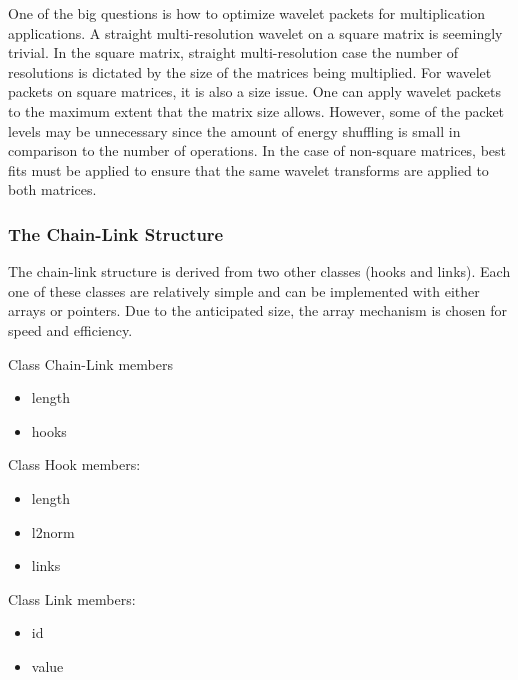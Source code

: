 One of the big questions is how to optimize wavelet packets for multiplication applications.  A straight multi-resolution wavelet on a square matrix is seemingly trivial.  In the square matrix, straight multi-resolution case the number of resolutions is dictated by the size of the matrices being multiplied.  For wavelet packets on square matrices, it is also a size issue.  One can apply wavelet packets to the maximum extent that the matrix size allows.  However, some of the packet levels may be unnecessary since the amount of energy shuffling is small in comparison to the number of operations.  In the case of non-square matrices, best fits must be applied to ensure that the same wavelet transforms are applied to both matrices. 

\subsubsection{The Chain-Link Structure}

The chain-link structure is derived from two other classes (hooks and links).   Each one of these classes are relatively simple and can be implemented with either arrays or pointers.  Due to the anticipated size, the array mechanism is chosen for speed and efficiency.  

Class Chain-Link members
\begin{itemize}
\item length 
\item hooks\end{itemize}

Class Hook 
members:
\begin{itemize}\item length
\item l2norm
\item links \end{itemize}


Class Link
members: 
\begin{itemize}\item id
\item value\end{itemize}


